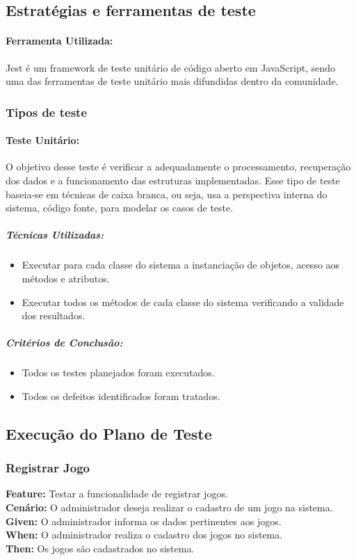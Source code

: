 \documentclass[a4paper, 12pt]{article}
\begin{document}
\subsection{Estratégias e ferramentas de teste}
\paragraph{Ferramenta Utilizada:} Jest é um framework de teste unitário de código aberto em JavaScript, sendo uma das ferramentas de teste unitário mais difundidas dentro da comunidade.
\subsubsection{Tipos de teste}
\paragraph{Teste Unitário:} O objetivo desse teste é verificar a adequadamente o processamento, recuperação dos dados e a funcionamento das estruturas implementadas. Esse tipo de teste baseia-se em técnicas de caixa branca, ou seja, usa a perspectiva interna do sistema, código fonte, para modelar os casos de teste.
\subparagraph{Técnicas Utilizadas:}
\begin{itemize}
    \item Executar para cada classe do sistema a instanciação de objetos, acesso aos métodos e atributos.
    \item Executar todos os métodos de cada classe do sistema verificando a validade dos resultados.
\end{itemize}
\subparagraph{Critérios de Conclusão:}
\begin{itemize}
    \item Todos os testes planejados foram executados.
    \item Todos os defeitos identificados foram tratados.
\end{itemize}

\subsection{Execução do Plano de Teste}
\subsubsection{Registrar Jogo}
\noindent
\textbf{Feature:} Testar a funcionalidade de registrar jogos. \\
\textbf{Cenário:} O administrador deseja realizar o cadastro de um jogo na sistema. \\
\textbf{Given:} O administrador informa os dados pertinentes aos jogos. \\
\textbf{When:} O administrador realiza o cadastro dos jogos no sistema. \\
\textbf{Then:} Os jogos são cadastrados no sistema.\\ 
\end{document}
